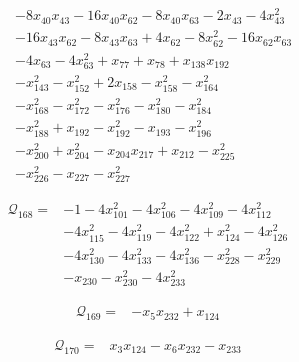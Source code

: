 \begin{align*}
&-8x_{40}x_{43}-16x_{40}x_{62}-8x_{40}x_{63}-2x_{43}-4x_{43}^{2}\\
&-16x_{43}x_{62}-8x_{43}x_{63}+4x_{62}-8x_{62}^{2}-16x_{62}x_{63}\\
&-4x_{63}-4x_{63}^{2}+x_{77}+x_{78}+x_{138}x_{192}\\
&-x_{143}^{2}-x_{152}^{2}+2x_{158}-x_{158}^{2}-x_{164}^{2}\\
&-x_{168}^{2}-x_{172}^{2}-x_{176}^{2}-x_{180}^{2}-x_{184}^{2}\\
&-x_{188}^{2}+x_{192}-x_{192}^{2}-x_{193}-x_{196}^{2}\\
&-x_{200}^{2}+x_{204}^{2}-x_{204}x_{217}+x_{212}-x_{225}^{2}\\
&-x_{226}^{2}-x_{227}-x_{227}^{2}
\end{align*}

\begin{align*}
\mathcal{Q}_{168}={}&-1-4x_{101}^{2}-4x_{106}^{2}-4x_{109}^{2}-4x_{112}^{2}\\
&-4x_{115}^{2}-4x_{119}^{2}-4x_{122}^{2}+x_{124}^{2}-4x_{126}^{2}\\
&-4x_{130}^{2}-4x_{133}^{2}-4x_{136}^{2}-x_{228}^{2}-x_{229}^{2}\\
&-x_{230}-x_{230}^{2}-4x_{233}^{2}
\end{align*}

\begin{align*}
\mathcal{Q}_{169}={}&-x_{5}x_{232}+x_{124}
\end{align*}

\begin{align*}
\mathcal{Q}_{170}={}&x_{3}x_{124}-x_{6}x_{232}-x_{233}
\end{align*}
